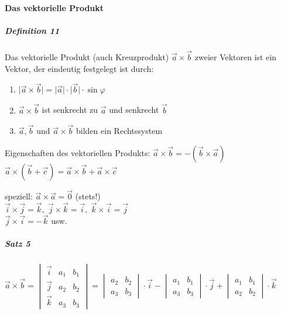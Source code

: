 \documentclass[a4paper]{scrartcl}
\begin{document}
\paragraph{Das vektorielle Produkt}
\subparagraph{Definition 11} Das vektorielle Produkt (auch Kreuzprodukt) $\vec{a} \times \vec{b}$ zweier Vektoren ist ein Vektor, der eindeutig festgelegt ist durch:
\begin{enumerate}
\item $\lvert \vec{a} \times \vec{b} \rvert = \lvert \vec{a} \rvert \cdot \lvert \vec{b} \rvert \cdot \sin{\varphi}$
\item $\vec{a} \times \vec{b}$ ist senkrecht zu $\vec{a}$ und senkrecht $\vec{b}$
\item $\vec{a},\vec{b} \text{ und } \vec{a} \times \vec{b}$ bilden ein Rechtssystem
\end{enumerate}

Eigenschaften des vektoriellen Produkts: $\vec{a} \times \vec{b} = - ( \vec{b} \times \vec{a} )$\\
$\vec{a} \times (\vec{b} + \vec{c}) = \vec{a} \times \vec{b} + \vec{a} \times \vec{c}$

speziell: $\vec{a} \times \vec{a} = \vec{0}$ (stets!)\\
$\vec{i} \times \vec{j} = \vec{k},\; \vec{j} \times \vec{k} = \vec{i},\; \vec{k} \times \vec{i} = \vec{j}$\\
$\vec{j} \times \vec{i} = - \vec{k}$ usw.

\subparagraph{Satz 5} $\vec{a} \times \vec{b} = \begin{vmatrix} \vec{i} & a_1 & b_1 \\
\vec{j} & a_2 & b_2 \\
\vec{k} & a_3 & b_3 \end{vmatrix} = \begin{vmatrix} a_2 & b_2\\
a_3 & b_3 \end{vmatrix} \cdot \vec{i} - \begin{vmatrix} a_1 & b_1 \\ a_3 & b_3 \end{vmatrix} \cdot \vec{j} + \begin{vmatrix} a_1 & b_1\\ a_2 & b_2 \end{vmatrix} \cdot \vec{k}$
\end{document}
